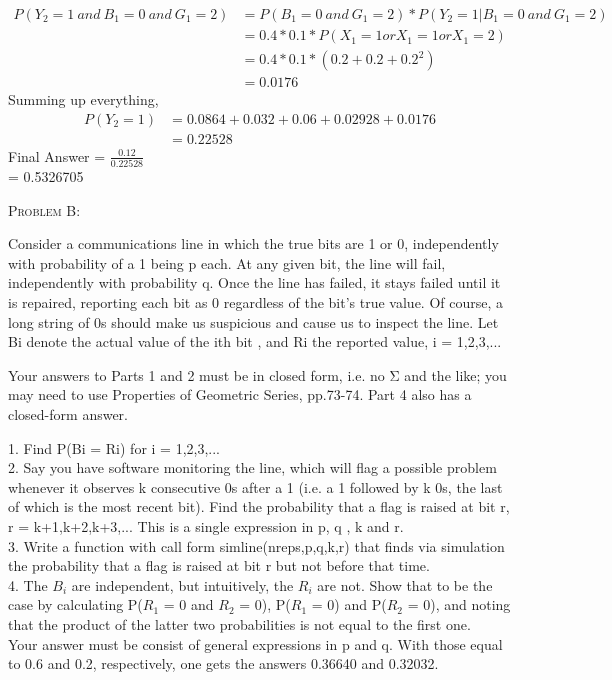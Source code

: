 \documentclass[12pt]{article}
\newenvironment{statement}[1]
{\begin{mdframed}[linewidth=0.6pt]
        \textsc{ #1:}

}
    {\end{mdframed}}
\begin{document}
\begin{align}
P(Y_2 = 1\ and\ B_1 = 0\ and\ G_1 = 2) & = P(B_1 = 0\ and\ G_1 = 2) * P(Y_2 = 1 | B_1 = 0\ and\ G_1 = 2) \nonumber \\
& = 0.4 * 0.1 * P(X_1 = 1 or X_1 = 1 or X_1 = 2 ) \nonumber \\
& = 0.4 * 0.1 *(0.2 + 0.2 + 0.2^2) \nonumber \\
& = 0.0176 \nonumber
\end{align}
Summing up everything,
\begin{align}
P(Y_2 = 1) & = 0.0864 + 0.032 + 0.06 + 0.02928 + 0.0176 \nonumber \\
& = 0.22528 \nonumber
\end{align}
Final Answer = $\frac{0.12}{0.22528}$\\
 = 0.5326705
\newpage
\begin{statement}{Problem B}
Consider a communications line in which the true bits are 1 or 0, independently with probability of a 1 being p each. At any given bit, the line will fail, independently with probability q. Once the line has failed, it stays failed until it is repaired, reporting each bit as 0 regardless of the bit's true value. Of course, a long string of 0s should make us suspicious and cause us to inspect the line. Let Bi denote the actual value of the ith bit , and Ri the reported value, i = 1,2,3,...

Your answers to Parts 1 and 2 must be in closed form, i.e. no Σ and the like; you may need to use Properties of Geometric Series, pp.73-74. Part 4 also has a closed-form answer.

1. Find P(Bi = Ri) for i = 1,2,3,...\\

2. Say you have software monitoring the line, which will flag a possible problem whenever it observes k consecutive 0s after a 1 (i.e. a 1 followed by k 0s, the last of which is the most recent bit). Find the probability that a flag is raised at bit r, r = k+1,k+2,k+3,... This is a single expression in p, q , k and r.\\

3. Write a function with call form
simline(nreps,p,q,k,r)
that finds via simulation the probability that a flag is raised at bit r but not before that time.\\

4. The $B_i$ are independent, but intuitively, the $R_i$ are not. Show that to be the case by calculating P($R_1$ = 0 and $R_2$ = 0), P($R_1$ = 0) and P($R_2$ = 0), and noting that the product of the latter two probabilities is not equal to the first one.\\
Your answer must be consist of general expressions in p and q. With those equal to 0.6 and 0.2, respectively, one gets the answers 0.36640 and 0.32032.

\end{statement}
\end{document}
